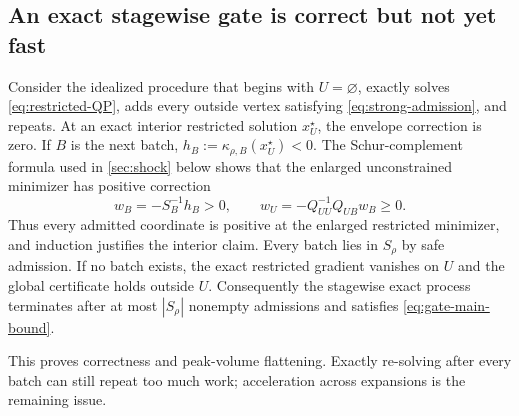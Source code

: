 \subsection{An exact stagewise gate is correct but not yet fast}

Consider the idealized procedure that begins with $U=\varnothing$, exactly
solves \cref{eq:restricted-QP}, adds every outside vertex satisfying
\cref{eq:strong-admission}, and repeats.  At an exact interior restricted
solution $x_U^\star$, the envelope correction is zero.  If $B$ is the next
batch, $h_B:=\kappa_{\rho,B}(x_U^\star)<0$.  The Schur-complement formula used in
\cref{sec:shock} below shows that the enlarged unconstrained minimizer has
positive correction
\begin{equation}
 w_B=-S_B^{-1}h_B>0,
 \qquad
 w_U=-Q_{UU}^{-1}Q_{UB}w_B\geq0.
 \label{eq:positive-expansion}
\end{equation}
Thus every admitted coordinate is positive at the enlarged restricted
minimizer, and induction justifies the interior claim.  Every batch lies in
$S_\rho$ by safe admission.  If no batch exists, the exact restricted
gradient vanishes on $U$ and the global certificate holds outside $U$.
Consequently the stagewise exact process terminates after at most
$|S_\rho|$ nonempty admissions and satisfies \cref{eq:gate-main-bound}.

This proves correctness and peak-volume flattening.  Exactly re-solving after
every batch can still repeat too much work; acceleration across expansions is
the remaining issue.
